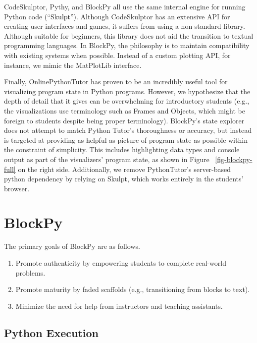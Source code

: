 \documentclass{sig-alternate}
\newcommand{\compresslist}{%
\setlength{\itemsep}{1pt}%
\setlength{\parskip}{0pt}%
\setlength{\parsep}{0pt}%
}
\begin{document}
CodeSkulptor, Pythy, and BlockPy all use the same internal engine for running Python code (``Skulpt''). 
Although CodeSkulptor has an extensive API for creating user interfaces and games, it suffers from using a non-standard library.
Although suitable for beginners, this library does not aid the transition to textual programming languages.
In BlockPy, the philosophy is to maintain compatibility with existing systems when possible.
Instead of a custom plotting API, for instance, we mimic the MatPlotLib interface.

Finally, OnlinePythonTutor has proven to be an incredibly useful tool for visualizing program state in Python programs.
However, we hypothesize that the depth of detail that it gives can be overwhelming for introductory students (e.g., the visualizations use terminology such as Frames and Objects, which might be foreign to students despite being proper terminology).
BlockPy's state explorer does not attempt to match Python Tutor's thoroughness or accuracy, but instead is targeted at providing as helpful as picture of program state as possible within the constraint of simplicity.
This includes highlighting data types and console output as part of the visualizers' program  state, as shown in Figure ~\ref{fig-blockpy-full} on the right side.
Additionally, we remove PythonTutor's server-based python dependency by relying on Skulpt, which works entirely in the students' browser.

\section{BlockPy}

The primary goals of BlockPy are as follows.
\vspace{-\medskipamount}

\begin{enumerate}\compresslist
\item Promote authenticity by empowering students to complete real-world problems.
\item Promote maturity by faded scaffolds (e.g., transitioning from blocks to text).
\item Minimize the need for help from instructors and teaching assistants.
\end{enumerate}

\subsection{Python Execution}
\end{document}
